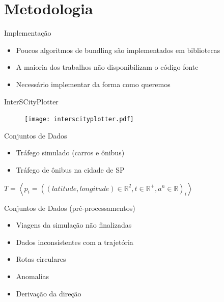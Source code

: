 \section{Metodologia}

\begin{frame}{Implementação}
  \begin{itemize}
    \item Poucos algoritmos de bundling são implementados em bibliotecas
    \item A maioria dos trabalhos não disponibilizam o código fonte
    \item Necessário implementar da forma como queremos
  \end{itemize}
\end{frame}

{
\begin{frame}{InterSCityPlotter}
  \begin{figure}[!htb]
    \centering
    \texttt{[image: interscityplotter.pdf]}
  \end{figure}
\end{frame}
}


\begin{frame}{Conjuntos de Dados}
  \begin{itemize}
    \item Tráfego simulado (carros e ônibus)
    \item Tráfego de ônibus na cidade de SP
  \end{itemize}

  \begin{center}
  $T = \left\langle p_i = ((latitude, longitude) \in \mathbb{R}^2, t \in \mathbb{R}^+, a^n \in \mathbb{R})_i \right\rangle$
  \end{center}
\end{frame}

\begin{frame}{Conjuntos de Dados (pré-processamentos)}
  \begin{itemize}
    \item Viagens da simulação não finalizadas
    \item Dados inconsistentes com a trajetória
    \item Rotas circulares
    \item Anomalias
    \item Derivação da direção
  \end{itemize}
\end{frame}

